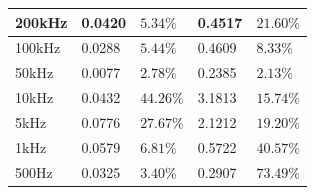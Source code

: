 \documentclass{article}
\begin{document}
\begin{table}[H]
\begin{tabular}{|l|l|l|l|l|}
		200kHz    & 0.0420                                                                                  & $5.34\%$                                                                                           & 0.4517                                                                                          & $21.60\%$                                                                                          \\ \hline
		100kHz    & 0.0288                                                                                  & $5.44\%$                                                                                           & 0.4609                                                                                          & $8.33\%$                                                                                           \\ \hline
		50kHz     & 0.0077                                                                                  & $2.78\%$                                                                                           & 0.2385                                                                                          & $2.13\%$                                                                                           \\ \hline
		10kHz     & 0.0432                                                                                  & $44.26\%$                                                                                          & 3.1813                                                                                          & $15.74\%$                                                                                          \\ \hline
		5kHz      & 0.0776                                                                                  & $27.67\%$                                                                                          & 2.1212                                                                                          & $19.20\%$                                                                                          \\ \hline
		1kHz      & 0.0579                                                                                  & $6.81\%$                                                                                           & 0.5722                                                                                          & $40.57\%$                                                                                          \\ \hline
		500Hz     & 0.0325                                                                                  & $3.40\%$                                                                                           & 0.2907                                                                                          & $73.49\%$                                                                                          \\ \hline
	\end{tabular}
\end{table}
\end{document}

